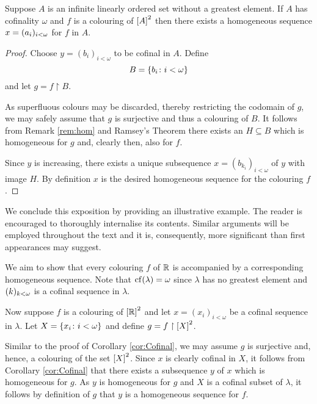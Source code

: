 \begin{cor}\label{cor:Cofinal}
	Suppose $A$ is an infinite linearly ordered set without a greatest element.
	If $A$ has cofinality $\omega$ and $f$ is a colouring of $\subsets{2}{A}$
	then there exists a homogeneous sequence $x=\family{a_i}{i<\omega}$ for $f$
	in $A$.
\end{cor}
\begin{proof}
	Choose $y=(b_i)_{i<\omega}$ to be cofinal in $A$.  Define
	\begin{equation}
		B=\setbuild{b_i}{i<\omega}
	\end{equation}
	and let $g=f\restriction B$.

	As superfluous colours may be discarded, thereby restricting the codomain of
	$g$, we may safely assume that $g$ is surjective and thus a colouring of
	$B$.  It follows from Remark \ref{rem:hom} and Ramsey's Theorem there exists
	an $H\subseteq B$ which is homogeneous for $g$ and, clearly then, also for
	$f$.

	Since $y$ is increasing, there exists a unique subsequence
	$x=(b_{k_i})_{i<\omega}$ of $y$ with image $H$.  By definition $x$ is the
	desired homogeneous sequence for the colouring $f$.
\end{proof}

We conclude this exposition by providing an illustrative example.  The reader is
encouraged to thoroughly internalise its contents.  Similar arguments will be
employed throughout the text and it is, consequently, more significant than
first appearances may suggest.

\begin{exm}
	We aim to show that every colouring $f$ of $\reals$ is accompanied by a
	corresponding homogeneous sequence.  Note that $\cf(\lambda)=\omega$ since
	$\lambda$ has no greatest element and $\family{k}{k<\omega}$ is a cofinal
	sequence in $\lambda$.

	Now suppose $f$ is a colouring of $\subsets{2}{\reals}$ and let $x=(x_i)_{i<\omega}$
	be a cofinal sequence in $\lambda$.  Let $X=\setbuild{x_i}{i<\omega}$ and
	define $g=f\restriction \subsets{2}{X}$.

	Similar to the proof of Corollary \ref{cor:Cofinal}, we may assume $g$ is
	surjective and, hence, a colouring of the set $\subsets{2}{X}$.  Since $x$
	is clearly cofinal in $X$, it follows from Corollary \ref{cor:Cofinal} that
	there exists a subsequence $y$ of $x$ which is homogeneous for $g$.  As $y$
	is homogeneous for $g$ and $X$ is a cofinal subset of $\lambda$, it follows
	by definition of $g$ that $y$ is a homogeneous sequence for $f$.
\end{exm}


